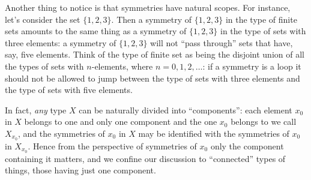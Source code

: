 Another thing to notice is that symmetries have natural scopes. For instance, let's consider the set $\{1,2,3\}$. Then a symmetry of $\{1,2,3\}$ in the type of finite sets amounts to the same thing as a symmetry of $\{1,2,3\}$ in the type of sets with three elements: a symmetry of $\{1,2,3\}$ will not ``pass through'' sets that have, say, five elements. Think of the type of finite set as being the disjoint union of all the types of sets with $n$-elements, where $n=0,1,2,\dots$: if a symmetry is a loop it should not be allowed to jump between the type of sets with three elements and the type of sets with five elements.

In fact, \emph{any} type $X$ can be naturally divided into ``components'': each element $x_0$ in $X$ belongs to one and only one component and the one $x_0$ belongs to we call $X_{x_0}$, and the symmetries of $x_0$ in $X$ may be identified with the symmetries of $x_0$ in $X_{x_0}$. Hence from the perspective of symmetries of $x_0$ only the component containing it matters, and we confine our discussion to ``connected'' types of things, \ie those having just one component.

